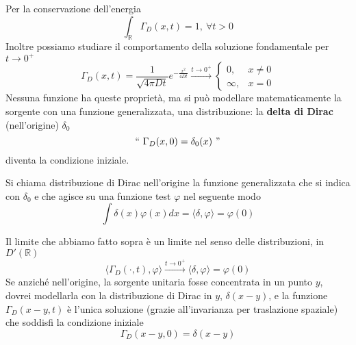 \documentclass[10pt,a4paper,twoside,openright]{book}
\begin{document}
Per la conservazione dell'energia
\begin{equation*}
\int _{\mathbb{R}} \Gamma _{D}(x,t) =1,\ \forall t >0
\end{equation*}
Inoltre possiamo studiare il comportamento della soluzione fondamentale per $\displaystyle t\rightarrow 0^{+}$
\begin{equation*}
\Gamma _{D}(x,t) =\frac{1}{\sqrt{4\pi Dt}} e^{-\frac{x^{2}}{4Dt}}\xrightarrow{t\rightarrow 0^{+}}\begin{cases}
0, & x\neq 0\\
\infty, & x=0
\end{cases}
\end{equation*}
Nessuna funzione ha queste proprietà, ma si può modellare matematicamente la sorgente con una funzione generalizzata, una distribuzione: la \textbf{delta di Dirac }(nell'origine) $\displaystyle \delta _{0}$
\begin{equation*}
``\ \Gamma _{D}(x,0) =\delta _{0}(x) \ "
\end{equation*}
diventa la condizione iniziale.
\begin{definition}
 Si chiama distribuzione di Dirac nell'origine la funzione generalizzata che si indica con $\displaystyle \delta _{0}$ e che agisce su una funzione test $\displaystyle \varphi $ nel seguente modo
\begin{equation*}
\int \delta (x) \varphi (x) dx=\langle \delta,\varphi \rangle =\varphi (0)
\end{equation*}
\end{definition}
Il limite che abbiamo fatto sopra è un limite nel senso delle distribuzioni, in $\displaystyle D'(\mathbb{R})$
\begin{equation*}
\langle \Gamma _{D}(\cdotp,t),\varphi \rangle \xrightarrow{t\rightarrow 0^{+}} \langle \delta,\varphi \rangle =\varphi (0)
\end{equation*}
Se anziché nell'origine, la sorgente unitaria fosse concentrata in un punto $\displaystyle y$, dovrei modellarla con la distribuzione di Dirac in $\displaystyle y$, $\displaystyle \delta (x-y)$, e la funzione $\displaystyle \Gamma _{D}(x-y,t)$ è l'unica soluzione (grazie all'invarianza per traslazione spaziale) che soddisfi la condizione iniziale 
\begin{equation*}
\Gamma _{D}(x-y,0) =\delta (x-y)
\end{equation*}
\end{document}
